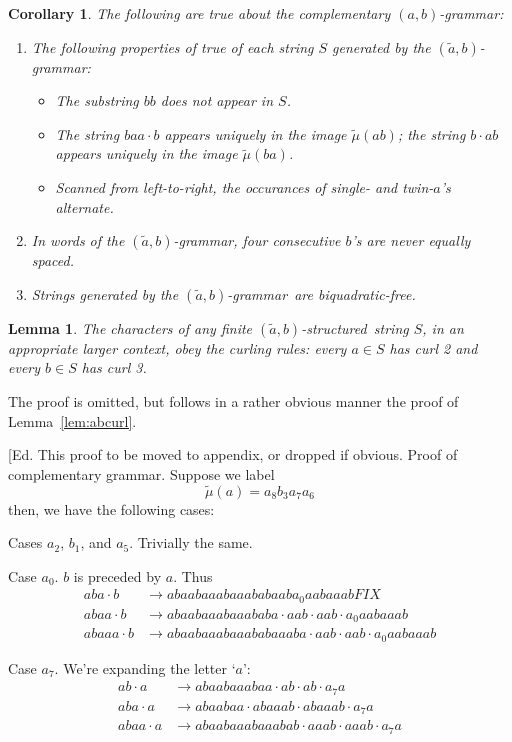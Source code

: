 \documentclass[11pt]{article}
\newcounter{thm}
\newtheorem{corollary}[thm]{Corollary}
\newtheorem{lemma}[thm]{Lemma}
\def\ni{\noindent}
\def\ab{$(a,b)$}
\def\abg{\ab-grammar}
\def\rmu{\tilde{\mu}}
\def\rabg{$(\tilde{a},b)$-grammar}
\def\rabs{$(\tilde{a},b)$-structured}
\def\q#1{`$#1$'}
\def\Proof{\ni{\bf Proof:} }
\begin{document}
\begin{corollary}
The following are true about the complementary \abg:
\begin{enumerate}
\item The following properties of true of each string $S$ generated by the
\rabg:
\begin{itemize}
\item The substring $bb$ does not appear in $S$.
\item The string $baa\cdot b$ appears uniquely in the image $\rmu(ab)$;
the string $b\cdot ab$ appears uniquely in the image $\rmu(ba)$.
\item Scanned from left-to-right, the occurances of single- and twin-$a$'s alternate.
\end{itemize}
\item In words of the \rabg, four consecutive $b$'s are never equally spaced.
\item Strings generated by the \rabg\ are biquadratic-free.
\end{enumerate}
\end{corollary}

\begin{lemma}\label{lem:rabcurl}
The characters of any finite \rabs\ string $S$, in an appropriate larger context, obey the curling rules: every $a\in S$ has curl 2 and every $b\in S$ has curl 3.
\end{lemma}
\ni The proof is omitted, but follows in a rather obvious manner the proof
of Lemma~\ref{lem:abcurl}.

\ni[Ed. This proof to be moved to appendix, or dropped if obvious. \Proof Proof of complementary grammar.  Suppose we label
$$\rmu(a)=a_8b_3a_7a_6$$
\ni then, we have the following cases:

\ni Cases $a_2$, $b_1$, and $a_5$.  Trivially the same.

\ni Case $a_0$.  $b$ is preceded by $a$.  Thus
\begin{align*}
aba\cdot b&\rightarrow abaabaaabaaababaaba_0aabaaab FIX\\
abaa\cdot b&\rightarrow abaabaaabaaababa\cdot aab\cdot aab\cdot a_0aabaaab\\
abaaa\cdot b&\rightarrow abaabaaabaaababaaaba\cdot aab\cdot aab\cdot a_0aabaaab
\end{align*}

\ni Case $a_7$. We're expanding the letter \q{a}:
\begin{align*}
ab\cdot a&\rightarrow abaabaaabaa\cdot ab\cdot ab\cdot a_7a\\
aba\cdot a&\rightarrow abaabaa\cdot abaaab\cdot abaaab\cdot a_7a\\
abaa\cdot a&\rightarrow abaabaaabaaabab\cdot aaab\cdot aaab\cdot a_7a
\end{align*}
\end{document}
